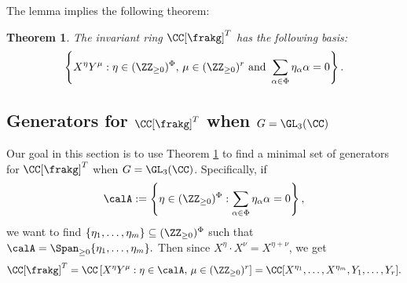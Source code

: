 \documentclass[12pt]{amsart}
\theoremstyle{plain}
\newtheorem{theorem}{Theorem}%
\begin{document}
The lemma implies the following theorem:

\begin{theorem}\label{invringbasis}
    The invariant ring $\CC[\frakg]^T$ has the following basis:
    $$\left\{ X^\eta Y^\mu :\eta \in (\ZZ_{\ge0})^{\Phi}, \, \mu \in (\ZZ_{\ge0})^r \text{ and }\sum_{\alpha\in\Phi} \eta_\alpha \alpha = 0\right\}.$$
\end{theorem}

\subsection{Generators for $\CC[\frakg]^T$ when $G = \GL_3(\CC)$}
Our goal in this section is to use Theorem \ref{invringbasis} to find a minimal set of generators for $\CC[\frakg]^T$ when $G = \GL_3(\CC)$.
Specifically, if
$$\calA := \left\{\eta \in (\ZZ_{\ge 0})^\Phi : \sum_{\alpha \in \Phi} \eta_\alpha \alpha = 0 \right\},$$
we want to find $\{\eta_1, \ldots, \eta_m\} \subseteq (\ZZ_{\ge 0})^\Phi$ such that $\calA = \Span_{\ge 0}\{\eta_1, \ldots, \eta_m\}.$
Then since $X^\eta \cdot X^\nu = X^{\eta + \nu}$, we get
$$\CC[\frakg]^T 
= \CC\left[X^\eta Y^\mu :\eta \in \calA, \, \mu \in (\ZZ_{\ge0})^r\right] 
= \CC[X^{\eta_1}, \ldots , X^{\eta_m}, Y_1, \ldots, Y_r].$$
\end{document}
